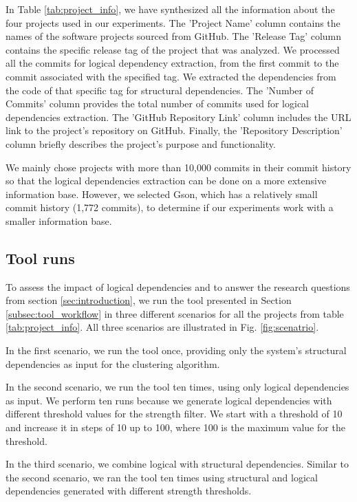 \documentclass{ieeeaccess}
\begin{document}
In Table \ref{tab:project_info}, we have synthesized all the information about the four projects used in our experiments. The 'Project Name' column contains the names of the software projects sourced from GitHub. The 'Release Tag' column contains the specific release tag of the project that was analyzed. We processed all the commits for logical dependency extraction, from the first commit to the commit associated with the specified tag. We extracted the dependencies from the code of that specific tag for structural dependencies. The 'Number of Commits' column provides the total number of commits used for logical dependencies extraction. The 'GitHub Repository Link' column includes the URL link to the project's repository on GitHub. Finally, the 'Repository Description' column briefly describes the project's purpose and functionality.

We mainly chose projects with more than 10,000 commits in their commit history so that the logical dependencies extraction can be done on a more extensive information base. However, we selected Gson, which has a relatively small commit history (1,772 commits), to determine if our experiments work with a smaller information base.

\subsection{Tool runs}

To assess the impact of logical dependencies and to answer the research questions from section \ref{sec:introduction}, we run the tool presented in Section \ref{subsec:tool_workflow} in three different scenarios for all the projects from table \ref{tab:project_info}. All three scenarios are illustrated in Fig. \ref{fig:scenatrio}.

In the first scenario, we run the tool once, providing only the system's structural dependencies as input for the clustering algorithm.

In the second scenario, we run the tool ten times, using only logical dependencies as input. We perform ten runs because we generate logical dependencies with different threshold values for the strength filter. We start with a threshold of 10 and increase it in steps of 10 up to 100, where 100 is the maximum value for the threshold.

In the third scenario, we combine logical with structural dependencies. Similar to the second scenario, we ran the tool ten times using structural and logical dependencies generated with different strength thresholds.
\end{document}
